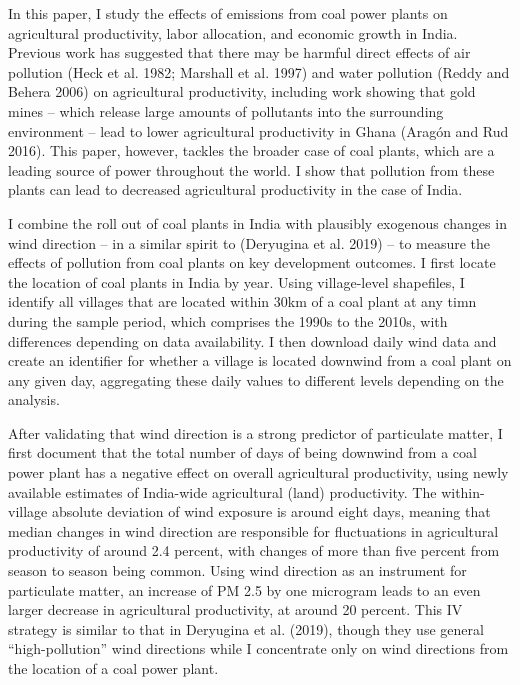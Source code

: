 \documentclass[
]{article}
\begin{document}
In this paper, I study the effects of emissions from coal power plants on agricultural productivity, labor allocation, and economic growth in India. Previous work has suggested that there may be harmful direct effects of air pollution (Heck et al. 1982; Marshall et al. 1997) and water pollution (Reddy and Behera 2006) on agricultural productivity, including work showing that gold mines -- which release large amounts of pollutants into the surrounding environment -- lead to lower agricultural productivity in Ghana (Aragón and Rud 2016). This paper, however, tackles the broader case of coal plants, which are a leading source of power throughout the world. I show that pollution from these plants can lead to decreased agricultural productivity in the case of India.

I combine the roll out of coal plants in India with plausibly exogenous changes in wind direction -- in a similar spirit to (Deryugina et al. 2019) -- to measure the effects of pollution from coal plants on key development outcomes. I first locate the location of coal plants in India by year. Using village-level shapefiles, I identify all villages that are located within 30km of a coal plant at any timn during the sample period, which comprises the 1990s to the 2010s, with differences depending on data availability. I then download daily wind data and create an identifier for whether a village is located downwind from a coal plant on any given day, aggregating these daily values to different levels depending on the analysis.

After validating that wind direction is a strong predictor of particulate matter, I first document that the total number of days of being downwind from a coal power plant has a negative effect on overall agricultural productivity, using newly available estimates of India-wide agricultural (land) productivity. The within-village absolute deviation of wind exposure is around eight days, meaning that median changes in wind direction are responsible for fluctuations in agricultural productivity of around 2.4 percent, with changes of more than five percent from season to season being common. Using wind direction as an instrument for particulate matter, an increase of PM 2.5 by one microgram leads to an even larger decrease in agricultural productivity, at around 20 percent. This IV strategy is similar to that in Deryugina et al. (2019), though they use general ``high-pollution'' wind directions while I concentrate only on wind directions from the location of a coal power plant.
\end{document}
